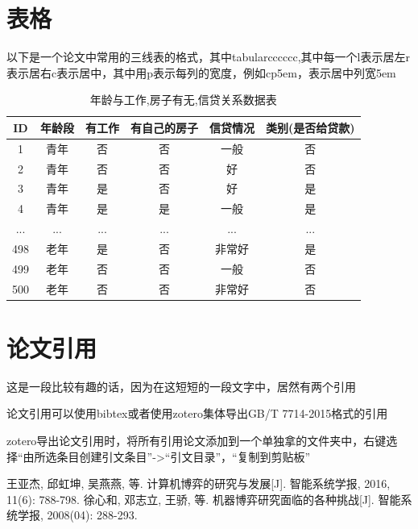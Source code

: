 \documentclass[bachelor,nocolorlinks, printoneside]{seuthesis} %
\begin{document}
\begin{Main}
\chapter{表格}
以下是一个论文中常用的三线表的格式，其中{tabular}{cccccc},其中每一个l表示居左r表示居右c表示居中，其中用p表示每列的宽度，例如cp5em，表示居中列宽5em
\begin{table}[htbp]
    \centering
    \caption{年龄与工作,房子有无,信贷关系数据表}
      \begin{tabular}{cccccc}
      \toprule
      ID       & 年龄段      & 有工作      & 有自己的房子   & 信贷情况     & 类别(是否给贷款) \\
      \midrule
      1        & 青年       & 否        & 否        & 一般       & 否 \\
      2        & 青年       & 否        & 否        & 好        & 否 \\
      3        & 青年       & 是        & 否        & 好        & 是 \\
      4        & 青年       & 是        & 是        & 一般       & 是 \\
      ...      & ...      & ...      & ...      & ...      & ... \\
      498      & 老年       & 是        & 否        & 非常好      & 是 \\
      499      & 老年       & 否        & 否        & 一般       & 否 \\
      500      & 老年       & 否        & 否        & 非常好      & 否 \\
      \bottomrule
      \end{tabular}%
    \label{tab:addlabel}%
\end{table}%

\chapter{论文引用}
这是一段比较有趣的话\cite{ref1}，因为在这短短的一段文字中，居然有两个引用\cite{ref2}

论文引用可以使用bibtex或者使用zotero集体导出GB/T 7714-2015格式的引用

zotero导出论文引用时，将所有引用论文添加到一个单独拿的文件夹中，右键选择“由所选条目创建引文条目”->“引文目录”，“复制到剪贴板”

\end{Main} %


\begin{thebibliography}{99}  
    王亚杰, 邱虹坤, 吴燕燕, 等. 计算机博弈的研究与发展[J]. 智能系统学报, 2016, 11(6): 788-798.
    徐心和, 邓志立, 王骄, 等. 机器博弈研究面临的各种挑战[J]. 智能系统学报, 2008(04): 288-293.
\end{thebibliography}
\end{document}
